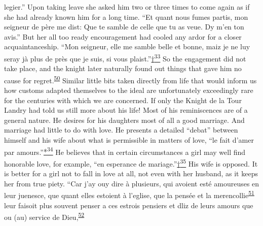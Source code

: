 legier.'' Upon taking leave she asked him two or three times to come
again as if she had already known him for a long time. ``Et quant nous
fumes partis, mon seigneur de père me dist: Que te samble de celle que
tu as veue. Dy m'en ton avis.'' But her all too ready encouragement had
cooled any ardor for a closer acquaintanceship. ``Mon seigneur, elle me
samble belle et bonne, maiz je ne luy seray jà plus de près que je suis,
si vous
plaist.''\protect\hypertarget{11_Chapter_Four__THE_FORMS_OF_LOVE.xhtmlux5cux23id_3163}{\protect\hyperlink{23_NOTES.xhtmlux5cux23id_3164}{†\textsuperscript{33}}}
So the engagement did not take place, and the knight later
\protect\hypertarget{11_Chapter_Four__THE_FORMS_OF_LOVE.xhtmlux5cux23page_149}{}{}naturally
found out things that gave him no cause for
regret.\textsuperscript{\protect\hypertarget{11_Chapter_Four__THE_FORMS_OF_LOVE.xhtmlux5cux23id_1389}{\protect\hyperlink{23_NOTES.xhtmlux5cux23id_1390}{50}}}
Similar little bits taken directly from life that would inform us how
customs adapted themselves to the ideal are unfortunately exceedingly
rare for the centuries with which we are concerned. If only the Knight
de la Tour Landry had told us still more about his life! Most of his
reminiscences are of a general nature. He desires for his daughters most
of all a good marriage. And marriage had little to do with love. He
presents a detailed ``debat'' between himself and his wife about what is
permissible in matters of love, ``le fait d'amer par
amours.''\protect\hypertarget{11_Chapter_Four__THE_FORMS_OF_LOVE.xhtmlux5cux23id_2313}{\protect\hyperlink{23_NOTES.xhtmlux5cux23id_2314}{*\textsuperscript{34}}}
He believes that in certain circumstances a girl may well find honorable
love, for example, ``en esperance de
mariage.''\protect\hypertarget{11_Chapter_Four__THE_FORMS_OF_LOVE.xhtmlux5cux23id_2316}{\protect\hyperlink{23_NOTES.xhtmlux5cux23id_2315}{†\textsuperscript{35}}}
His wife is opposed. It is better for a girl not to fall in love at all,
not even with her husband, as it keeps her from true piety. ``Car j'ay
ouy dire à plusieurs, qui avoient esté amoureuses en leur juenesce, que
quant elles estoient à l'eglise, que la pensée et la
merencollie\textsuperscript{\protect\hypertarget{11_Chapter_Four__THE_FORMS_OF_LOVE.xhtmlux5cux23id_1387}{\protect\hyperlink{23_NOTES.xhtmlux5cux23id_1388}{51}}}
leur faisoit plus souvent penser a ces estrois pensiers et dliz de leurs
amours que ou (au) service de
Dieu,\textsuperscript{\protect\hypertarget{11_Chapter_Four__THE_FORMS_OF_LOVE.xhtmlux5cux23id_1385}{\protect\hyperlink{23_NOTES.xhtmlux5cux23id_1386}{52}}}
